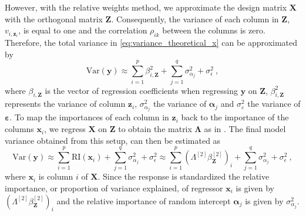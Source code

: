 However, with the relative weights method, we approximate the design matrix $\mathbf{X}$ with the orthogonal matrix $\mathbf{Z}$. 
Consequently, the variance of each column in $\mathbf{Z}$, $v_{i, \mathbf{z}_i}$, is equal to one and the correlation $\rho_{ik}$ between the columns is zero. 
Therefore, the total variance in \eqref{eq:variance_theoretical_x} can be approximated by
\begin{equation}\label{eq:variance_rw}
    \text{Var}(\mathbf{y}) \approx \sum_{i=1}^p \beta_{i, \mathbf{Z}}^2 + \sum_{j=1}^q \sigma^2_{\alpha_j} + \sigma^2_{\epsilon} \ ,
\end{equation}
where $\beta_{i, \mathbf{Z}}$ is the vector of regression coefficients when regressing $\mathbf{y}$ on $\mathbf{Z}$, $\beta_{i, \mathbf{Z}}^2$ represents the variance of column $\mathbf{z}_i$, $\sigma_{\alpha_j}^2$ the variance of $\boldsymbol{\alpha}_j$ and $\sigma^2_{\varepsilon}$ the variance of $\boldsymbol{\varepsilon}$.
To map the importances of each column in $\mathbf{z}_i$ back to the importance of the columns $\mathbf{x}_i$, we regress $\mathbf{X}$ on $\mathbf{Z}$ to obtain the matrix $\boldsymbol{\Lambda}$ as in .
The final model variance obtained from this setup, can then be estimated as 
\begin{equation}
    \label{eq:variance_calc}
    \text{Var}(\mathbf{y}) \approx \sum_{i=1}^p \text{RI}(\mathbf{x}_i) + \sum_{j=1}^q \sigma^2_{\alpha_j} + \sigma^2_{\epsilon} \approx \sum_{i=1}^p (\Lambda^{[2]}\beta_{\mathbf{Z}}^{[2]})_i + \sum_{j=1}^q \sigma^2_{\alpha_j} + \sigma^2_{\epsilon} \ ,
\end{equation}
where $\mathbf{x}_i$ is column $i$ of $\mathbf{X}$.  
Since the response is standardized the relative importance, or proportion of variance explained, of regressor $\mathbf{x}_i$ is given by $(\Lambda^{[2]}\beta_{\mathbf{Z}}^{[2]})_i$ and the relative importance of random intercept $\boldsymbol{\alpha}_j$ is given by $\sigma^2_{\alpha_j}$.
